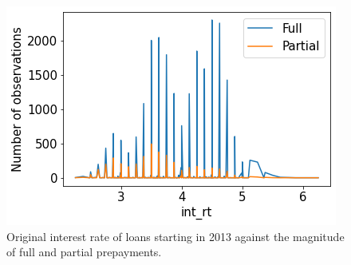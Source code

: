     \begin{figure}[H]
        \centering
        \includegraphics[width=0.6\linewidth]{Latex/Report/Figures/int_rt againts Full and Partial prepayments.png}
        \caption{Original interest rate of loans starting in 2013 against the magnitude of full and partial prepayments.}
        \label{model_int_rt_against_prepayment}
    \end{figure}
        
